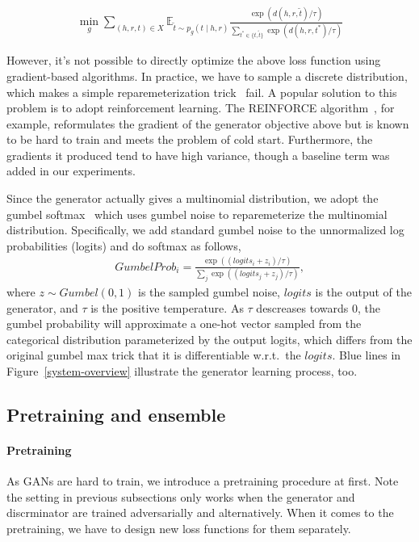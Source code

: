 \documentclass[twocolumn,a4paper,10pt,review,5p]{elsarticle}
\begin{document}
\begin{align*}
    \min_g \sum_{(h, r, t)\in X}
        \mathbb{E}_{\tilde t \sim p_g(t \mid h, r)}
            \frac{\exp(d(h, r, \tilde t) / \tau)}
                 {\sum_{t^* \in \{ t, \tilde t\}} \exp(d(h, r, t^*) / \tau)}
\end{align*}

However, it's not possible to directly optimize the above loss function using gradient-based algorithms. In practice, we have to sample a discrete distribution, which makes a simple reparemeterization trick~\cite{VAE} fail. A popular solution to this problem is to adopt reinforcement learning. The REINFORCE algorithm~\cite{Williams_1992}, for example, reformulates the gradient of the generator objective above but is known to be hard to train and meets the problem of cold start. Furthermore, the gradients it produced tend to have high variance, though a baseline term was added in our experiments.

Since the generator actually gives a multinomial distribution, we adopt the gumbel softmax~\cite{GumbelSoftmax_Jiang_2016} which uses gumbel noise to reparemeterize the multinomial distribution. Specifically, we add standard gumbel noise to the unnormalized log probabilities (logits) and do softmax as follows,
\begin{align*}
    GumbelProb_i = \frac{\exp((logits_i + z_i)/ \tau)}{\sum_{j}\exp((logits_j + z_j)/ \tau)},
\end{align*}
where $z \sim Gumbel(0, 1)$ is the sampled gumbel noise, $logits$ is the output of the generator, and $\tau$ is the positive temperature. As $\tau$ descreases towards 0, the gumbel probability will approximate a one-hot vector sampled from the categorical distribution parameterized by the output logits, which differs from the original gumbel max trick that it is differentiable w.r.t.\ the $logits$. Blue lines in Figure~\ref{system-overview} illustrate the generator learning process, too.


\subsection{Pretraining and ensemble}

\paragraph{Pretraining} As GANs are hard to train, we introduce a pretraining procedure at first. Note the setting in previous subsections only works when the generator and discrminator are trained adversarially and alternatively. When it comes to the pretraining, we have to design new loss functions for them separately.
\end{document}
